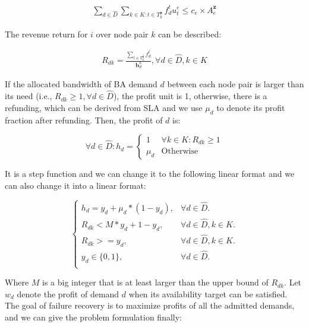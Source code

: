 \documentclass[sigconf]{acmart}
\begin{document}
\begin{small}
\begin{eqnarray} \label{B-constraint}
\sum_{d\in \hat{D}}\sum_{k\in K:t\in T^{ \mathbf{z}}_k} f^{t}_{d}u_t^e \le c_e \times A_e^{ \mathbf{z}}
\end{eqnarray}
\end{small}

The revenue return for $i$ over node pair $k$ can be described:
\begin{small}
\begin{eqnarray} \label{B-return}
R_{dk}=\frac{\sum_{t\in T^{ \mathbf{z}}_k} f^{t}_{d}}{\mathbf{b}^k_d}, \forall  d \in \hat{D},  k \in K
\end{eqnarray}
\end{small}


If the allocated bandwidth  of BA demand $d$ between each node pair is larger than its need (i.e., $R_{dk} \ge 1, \forall d \in  \hat{D}$), the profit unit is 1, 
otherwise, there is a refunding, which can be derived from SLA and we use $\mu_{d}$ to denote its profit fraction after refunding.
Then, the profit of $d$ is:



\begin{equation}
\forall  d \in \hat{D} : h_d=
\begin{cases}
1 &\text{$\forall k \in K: R_{dk} \ge 1 $}\\
\mu_{d} &\text{Otherwise}
\end{cases}
\label{availability222}
\end{equation}

It is a step function and we can change it to the following linear format and we can also change it into a linear format:

\begin{equation}
\begin{cases}
h_d=y_d+\mu_{d}*(1-y_d),&{\forall d \in \hat{D}.} \\
R_{dk} < M*y_d+1-y_d,&{\forall d \in \hat{D},  k\in K.} \\
R_{dk} >= y_d,&{\forall d \in \hat{D},  k\in K.} \\
y_d \in\{0,1\},&{\forall d \in \hat{D}.} \\
\end{cases}
\label{A-SSS2}
\end{equation}

Where $M$ is a big integer that is at least larger than the upper bound of $R_{dk}$.
Let $w_d$ denote the profit of demand $d$ when its availability target can be satisfied.
The goal of failure recovery is to maximize profits of all the admitted demands, and we can give the problem formulation finally:
\end{document}
